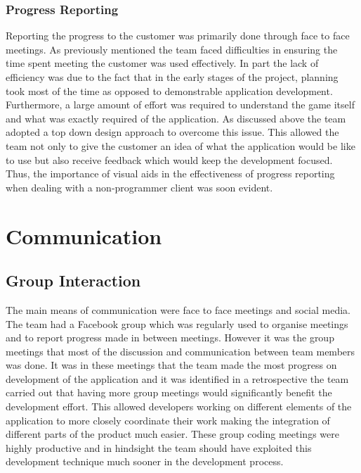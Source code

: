 \documentclass{l3proj}
\begin{document}
\subsubsection{Progress Reporting}
Reporting the progress to the customer was primarily done through face to face meetings. As previously mentioned the team faced difficulties in ensuring the time spent meeting the customer was used effectively. In part the lack of efficiency was due to the fact that in the early stages of the project, planning took most of the time as opposed to demonstrable application development. Furthermore, a large amount of effort was required to understand the game itself and what was exactly required of the application. As discussed above the team adopted a top down design approach to overcome this issue. This allowed the team not only to give the customer an idea of what the application would be like to use but also receive feedback which would keep the development focused. Thus, the importance of visual aids in the effectiveness of progress reporting when dealing with a non-programmer client was soon evident.

\section{Communication}
\label{sec:communication}

\subsection{Group Interaction}
The main means of communication were face to face meetings and social media. The team had a Facebook group which was regularly used to organise meetings and to report progress made in between meetings. However it was the group meetings that most of the discussion and communication between team members was done. It was in these meetings that the team made the most progress on development of the application and it was identified in a retrospective the team carried out that having more group meetings would significantly benefit the development effort. This allowed developers working on different elements of the application to more closely coordinate their work making the integration of different parts of the product much easier. These group coding meetings were highly productive and in hindsight the team should have exploited this development technique much sooner in the development process.
\end{document}
